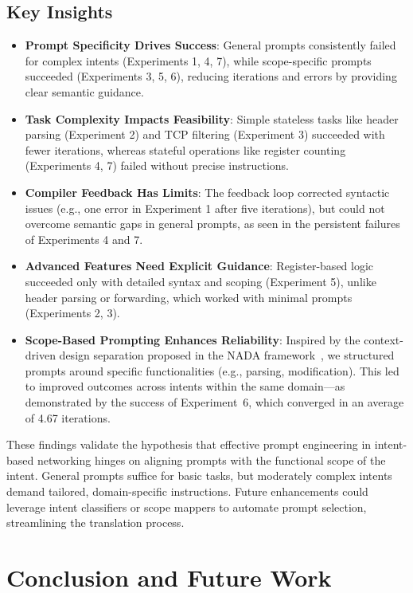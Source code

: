\documentclass[sigconf]{acmart}
\begin{document}
\subsection*{Key Insights}
\begin{itemize}
    \item \textbf{Prompt Specificity Drives Success}: General prompts consistently failed for complex intents (Experiments 1, 4, 7), while scope-specific prompts succeeded (Experiments 3, 5, 6), reducing iterations and errors by providing clear semantic guidance.
    \item \textbf{Task Complexity Impacts Feasibility}: Simple stateless tasks like header parsing (Experiment 2) and TCP filtering (Experiment 3) succeeded with fewer iterations, whereas stateful operations like register counting (Experiments 4, 7) failed without precise instructions.
    \item \textbf{Compiler Feedback Has Limits}: The feedback loop corrected syntactic issues (e.g., one error in Experiment 1 after five iterations), but could not overcome semantic gaps in general prompts, as seen in the persistent failures of Experiments 4 and 7.
    \item \textbf{Advanced Features Need Explicit Guidance}: Register-based logic succeeded only with detailed syntax and scoping (Experiment 5), unlike header parsing or forwarding, which worked with minimal prompts (Experiments 2, 3).
    \item \textbf{Scope-Based Prompting Enhances Reliability}:
    Inspired by the context-driven design separation proposed in the NADA framework~\cite{he2024nada}, we structured prompts around specific functionalities (e.g., parsing, modification). This led to improved outcomes across intents within the same domain—as demonstrated by the success of Experiment~6, which converged in an average of 4.67 iterations.
    

\end{itemize}

These findings validate the hypothesis that effective prompt engineering in intent-based networking hinges on aligning prompts with the functional scope of the intent. General prompts suffice for basic tasks, but moderately complex intents demand tailored, domain-specific instructions. Future enhancements could leverage intent classifiers or scope mappers to automate prompt selection, streamlining the translation process.

\section{Conclusion and Future Work}
\end{document}
